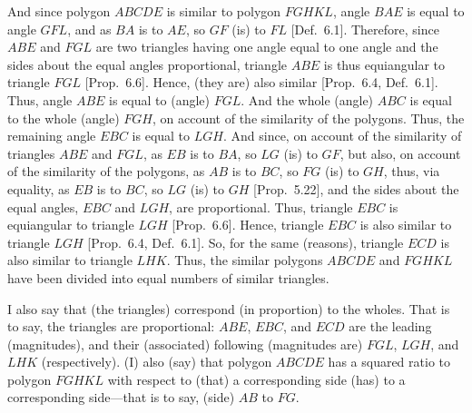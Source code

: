 \begin{Parallel}{}{}
{And since polygon $ABCDE$ is similar to polygon $FGHKL$, angle
$BAE$ is equal to angle $GFL$,
and as $BA$ is to $AE$, so $GF$ (is) to $FL$ [Def.~6.1].
Therefore, since $ABE$ and $FGL$ are two triangles having one angle equal
to one angle  and the sides about the equal angles proportional, triangle
$ABE$ is thus equiangular to triangle $FGL$ [Prop.~6.6]. Hence, (they are) also similar
 [Prop.~6.4, Def.~6.1]. Thus, angle $ABE$ is equal to
(angle) $FGL$.  And the whole (angle) $ABC$ is equal to the whole (angle)
$FGH$, on  account of the similarity of the polygons. Thus, the remaining
angle $EBC$ is equal to $LGH$. And since, on account of the similarity of
triangles $ABE$ and $FGL$, as $EB$ is to $BA$, so $LG$ (is) to $GF$, but 
also, on account of the similarity of the polygons, as $AB$ is to $BC$, so
$FG$ (is) to $GH$, thus, via equality, as $EB$ is to $BC$, so $LG$ (is) to $GH$ [Prop.~5.22], and the sides about the
equal angles, $EBC$ and $LGH$, are  proportional. Thus, triangle
$EBC$ is equiangular to triangle $LGH$ [Prop.~6.6]. Hence, triangle $EBC$ is also
similar to triangle $LGH$  [Prop.~6.4, Def.~6.1]. So, for the same (reasons), triangle
$ECD$ is also similar to triangle $LHK$. Thus, the similar
polygons $ABCDE$ and $FGHKL$ have been divided into
equal numbers of similar triangles.

I also say that (the triangles) correspond (in proportion) to the wholes.
That is to say,  the triangles are proportional:  $ABE$, $EBC$, and
$ECD$ are the leading (magnitudes), and their (associated) following (magnitudes are) 
$FGL$, $LGH$, and $LHK$ (respectively). (I) also (say) that polygon
$ABCDE$ has a squared ratio to polygon $FGHKL$ with respect to
(that) a corresponding side (has) to a corresponding side---that is to
say, (side) $AB$ to $FG$.

}
\end{Parallel}
